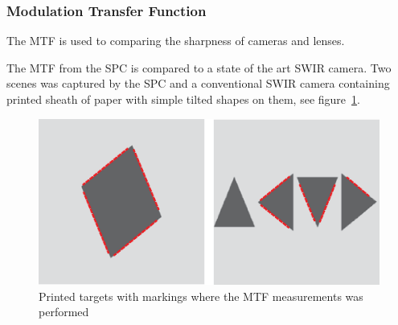 \subsubsection{Modulation Transfer Function}
The MTF is used to comparing the sharpness of cameras and lenses.  


The MTF from the SPC is compared to a state of the art SWIR camera. Two scenes was captured by the SPC and a conventional SWIR camera containing printed sheath of paper with simple tilted shapes on them, see figure~\ref{fig:mtf_target}. 



\begin{figure}[H]
    \centering
    \includegraphics[width=0.9\linewidth]{result/mtf/Target.eps}
    \caption{Printed targets with markings where the MTF measurements was performed}
    \label{fig:mtf_target}
\end{figure}

